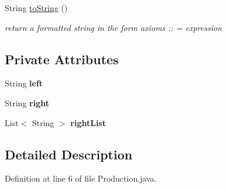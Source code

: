 \begin{DoxyCompactItemize}
\item 
\hypertarget{classcontext_free_1_1grammar_1_1_production_a43d78cd85446efbbffe59a2278c410d1}{String \hyperlink{classcontext_free_1_1grammar_1_1_production_a43d78cd85446efbbffe59a2278c410d1}{to\-String} ()}\label{classcontext_free_1_1grammar_1_1_production_a43d78cd85446efbbffe59a2278c410d1}

\begin{DoxyCompactList}\small\item\em return a formatted string in the form axioms \-:\-: = expression \end{DoxyCompactList}\end{DoxyCompactItemize}
\subsection*{Private Attributes}
\begin{DoxyCompactItemize}
\item 
\hypertarget{classcontext_free_1_1grammar_1_1_production_ad188a705cd57d55d32fd198e6af71f75}{String {\bfseries left}}\label{classcontext_free_1_1grammar_1_1_production_ad188a705cd57d55d32fd198e6af71f75}

\item 
\hypertarget{classcontext_free_1_1grammar_1_1_production_ab72c30da44fb1fbf41b9a70bf799ef58}{String {\bfseries right}}\label{classcontext_free_1_1grammar_1_1_production_ab72c30da44fb1fbf41b9a70bf799ef58}

\item 
\hypertarget{classcontext_free_1_1grammar_1_1_production_a51394e602f57b3e2f9b07d14fd01adb9}{List$<$ String $>$ {\bfseries right\-List}}\label{classcontext_free_1_1grammar_1_1_production_a51394e602f57b3e2f9b07d14fd01adb9}

\end{DoxyCompactItemize}


\subsection{Detailed Description}


Definition at line 6 of file Production.\-java.



